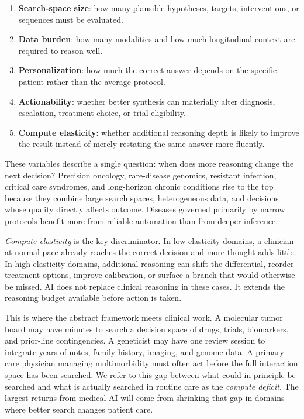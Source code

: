 \documentclass[11pt]{article}
\begin{document}
\begin{enumerate}
  \item \textbf{Search-space size}: how many plausible hypotheses, targets, interventions, or sequences must be evaluated.
  \item \textbf{Data burden}: how many modalities and how much longitudinal context are required to reason well.
  \item \textbf{Personalization}: how much the correct answer depends on the specific patient rather than the average protocol.
  \item \textbf{Actionability}: whether better synthesis can materially alter diagnosis, escalation, treatment choice, or trial eligibility.
  \item \textbf{Compute elasticity}: whether additional reasoning depth is likely to improve the result instead of merely restating the same answer more fluently.
\end{enumerate}

These variables describe a single question: when does more reasoning change the next decision? Precision oncology, rare-disease genomics, resistant infection, critical care syndromes, and long-horizon chronic conditions rise to the top because they combine large search spaces, heterogeneous data, and decisions whose quality directly affects outcome. Diseases governed primarily by narrow protocols benefit more from reliable automation than from deeper inference.

\textit{Compute elasticity} is the key discriminator. In low-elasticity domains, a clinician at normal pace already reaches the correct decision and more thought adds little. In high-elasticity domains, additional reasoning can shift the differential, reorder treatment options, improve calibration, or surface a branch that would otherwise be missed. AI does not replace clinical reasoning in these cases. It extends the reasoning budget available before action is taken.

This is where the abstract framework meets clinical work. A molecular tumor board may have minutes to search a decision space of drugs, trials, biomarkers, and prior-line contingencies. A geneticist may have one review session to integrate years of notes, family history, imaging, and genome data. A primary care physician managing multimorbidity must often act before the full interaction space has been searched. We refer to this gap between what could in principle be searched and what is actually searched in routine care as the \emph{compute deficit}. The largest returns from medical AI will come from shrinking that gap in domains where better search changes patient care.
\end{document}
